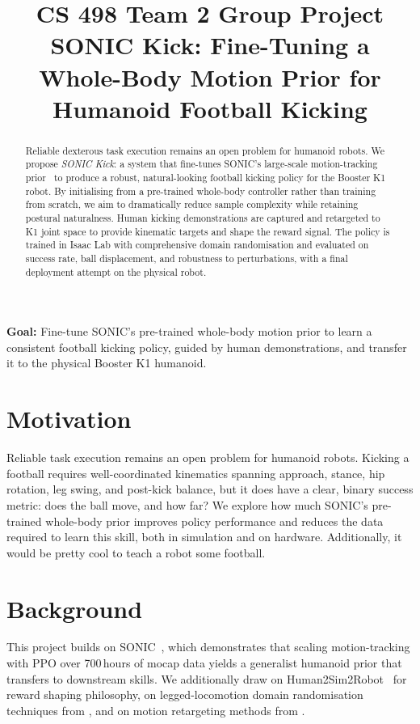 \documentclass[12pt]{article}
\title{CS 498 Team 2 Group Project \\ \large SONIC Kick: Fine-Tuning a Whole-Body Motion Prior for Humanoid Football Kicking}
\author{}
\date{}
\begin{document}
\maketitle

\noindent\textbf{Goal:} Fine-tune SONIC's pre-trained whole-body motion prior to learn a consistent football kicking policy, guided by human demonstrations, and transfer it to the physical Booster K1 humanoid.

\begin{abstract}
Reliable dexterous task execution remains an open problem for humanoid robots. We propose \textit{SONIC Kick}: a system that fine-tunes SONIC's large-scale motion-tracking prior~\cite{luo2025sonic} to produce a robust, natural-looking football kicking policy for the Booster K1 robot. By initialising from a pre-trained whole-body controller rather than training from scratch, we aim to dramatically reduce sample complexity while retaining postural naturalness. Human kicking demonstrations are captured and retargeted to K1 joint space to provide kinematic targets and shape the reward signal. The policy is trained in Isaac Lab with comprehensive domain randomisation and evaluated on success rate, ball displacement, and robustness to perturbations, with a final deployment attempt on the physical robot.
\end{abstract}

\section{Motivation}
Reliable task execution remains an open problem for humanoid robots. Kicking a football requires well-coordinated kinematics spanning approach, stance, hip rotation, leg swing, and post-kick balance, but it does have a clear, binary success metric: does the ball move, and how far? We explore how much SONIC's pre-trained whole-body prior improves policy performance and reduces the data required to learn this skill, both in simulation and on hardware. Additionally, it would be pretty cool to teach a robot some football.

\section{Background}
This project builds on SONIC~\cite{luo2025sonic}, which demonstrates that scaling motion-tracking with PPO over 700\,hours of mocap data yields a generalist humanoid prior that transfers to downstream skills. We additionally draw on Human2Sim2Robot~\cite{lum2025human2sim2robot} for reward shaping philosophy, on legged-locomotion domain randomisation techniques from \citet{kumar2021rma}, and on motion retargeting methods from \citet{cheng2024expressive}.
\end{document}
